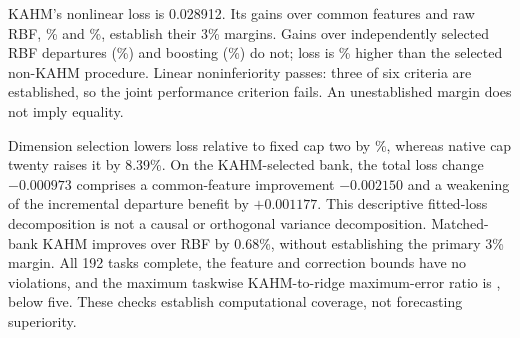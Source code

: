 \begin{table}[t]
\centering\small
\setlength{\tabcolsep}{3.5pt}
\caption{The preceding dimension study's unchanged six-claim family.
$L_K,L_m$ are mean SMSEs. Gain is $100(1-L_K/L_m)$.
The first five rows test a 3\% nonlinear improvement and the last a
5\% linear noninferiority tolerance. The simultaneous lower endpoint
concerns the absolute margin contrast; a positive endpoint establishes
the criterion. The complete ten-procedure results remain in the appendix.}
\label{tab:mechanism-primary}

\end{table}

KAHM's nonlinear loss is 0.028912. Its gains over common features and
raw RBF, \DFGainCommon\% and \DFGainRawRBF\%, establish their
3\% margins. Gains over independently selected RBF departures
(\DFGainRBF\%) and boosting (\DFGainHGB\%) do not; loss is
\DFWorsePolicy\% higher than the selected non-KAHM procedure.
Linear noninferiority passes: three of six criteria are established,
so the joint performance criterion fails. An unestablished margin does
not imply equality.

Dimension selection lowers loss relative to fixed cap two by
\DFDimensionGain\%, whereas native cap twenty raises it by 8.39\%.
On the KAHM-selected bank, the total loss change $-0.000973$ comprises
a common-feature improvement $-0.002150$ and a weakening of the
incremental departure benefit by $+0.001177$. This descriptive fitted-loss
decomposition is not a causal or orthogonal variance decomposition.
Matched-bank KAHM improves over RBF by 0.68\%, without establishing
the primary 3\% margin. All 192 tasks complete, the feature and
correction bounds have no violations, and the maximum taskwise
KAHM-to-ridge maximum-error ratio is \DFMaxErrorRatio{}, below five.
These checks establish computational coverage, not forecasting superiority.
